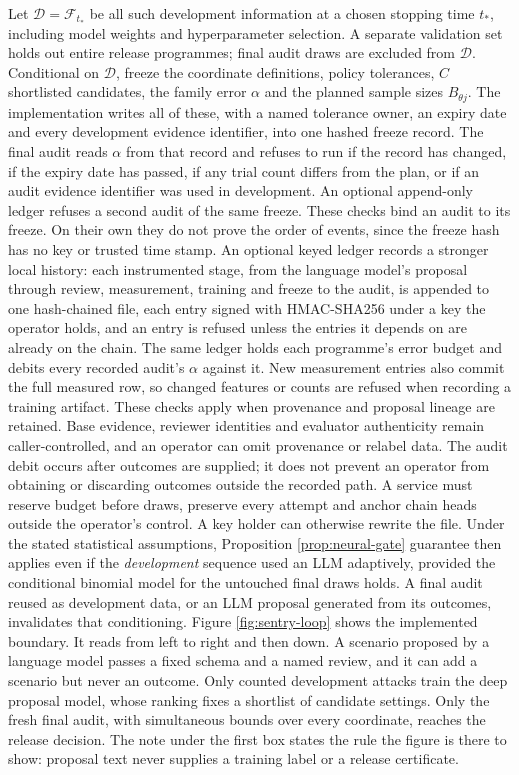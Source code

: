 Let $\mathcal D=\mathcal F_{t_*}$ be all such development information at a
chosen stopping time $t_*$, including model weights and hyperparameter
selection. A separate validation set holds out entire release programmes;
final audit draws are excluded from $\mathcal D$. Conditional on $\mathcal D$,
freeze the coordinate definitions, policy tolerances, $C$ shortlisted
candidates, the family error $\alpha$ and the planned sample sizes
$B_{\theta j}$. The implementation writes all of these, with a named
tolerance owner, an expiry date and every development evidence identifier,
into one hashed freeze record. The final audit reads $\alpha$ from that
record and refuses to run if the record has changed, if the expiry date has
passed, if any trial count differs from the plan, or if an audit evidence
identifier was used in development. An optional append-only ledger refuses a
second audit of the same freeze. These checks bind an audit to its freeze.
On their own they do not prove the order of events, since the freeze hash has
no key or trusted time stamp. An optional keyed ledger records a stronger
local history: each instrumented stage, from the language model's proposal through
review, measurement, training and freeze to the audit, is appended to one
hash-chained file, each entry signed with HMAC-SHA256 under a key the operator
holds, and an entry is refused unless the entries it depends on are already on
the chain. The same ledger holds each programme's error budget and debits
every recorded audit's $\alpha$ against it. New measurement entries also commit
the full measured row, so changed features or counts are refused when recording
a training artifact. These checks apply when provenance and proposal lineage
are retained. Base evidence, reviewer identities and evaluator authenticity
remain caller-controlled, and an operator can omit provenance or relabel data.
The audit debit occurs after outcomes are supplied; it does not prevent an
operator from obtaining or discarding outcomes outside the recorded path. A
service must reserve budget before draws, preserve every attempt and anchor
chain heads outside the operator's control. A key holder can otherwise rewrite
the file. Under the stated statistical assumptions, Proposition
\ref{prop:neural-gate} guarantee then applies even if the \emph{development}
sequence used an LLM adaptively, provided the conditional binomial model for
the untouched final draws holds. A final audit reused as development data, or
an LLM proposal generated from its outcomes, invalidates that conditioning.
Figure \ref{fig:sentry-loop} shows the implemented boundary. It reads from left
to right and then down. A scenario proposed by a language model passes a fixed
schema and a named review, and it can add a scenario but never an outcome. Only
counted development attacks train the deep proposal model, whose ranking fixes a
shortlist of candidate settings. Only the fresh final audit, with simultaneous
bounds over every coordinate, reaches the release decision. The note under the
first box states the rule the figure is there to show: proposal text never
supplies a training label or a release certificate.


